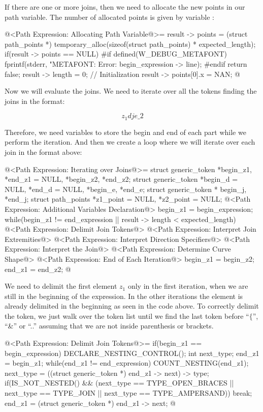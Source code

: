 If there are one or more joins, then we need to allocate the new
points in our path variable. The number of allocated points is given
by variable :

\iniciocodigo
@<Path Expression: Allocating Path Variable@>=
result -> points = (struct path_points *)
                     temporary_alloc(sizeof(struct path_points) *
                     expected_length);
if(result -> points == NULL){
#if defined(W_DEBUG_METAFONT)
  fprintf(stderr, "METAFONT: Error: %
          begin_expression -> line);
#endif
    return false;
}
result -> length = 0; // Initialization
result -> points[0].x = NAN;
@
\fimcodigo

Now we will evaluate the joins. We need to iterate over all the tokens
finding the joins in the format:

$$
z_1{d} j {e}\_2
$$

Therefore, we need variables to store the begin and end of each part
while we perform the iteration. And then we create a loop where we
will iterate over each join in the format above:

\iniciocodigo
@<Path Expression: Iterating over Joins@>=
{
  struct generic_token *begin_z1, *end_z1 = NULL, *begin_z2, *end_z2;
  struct generic_token *begin_d = NULL, *end_d = NULL, *begin_e, *end_e;
  struct generic_token * begin_j, *end_j;
  struct path_points *z1_point = NULL, *z2_point = NULL;
  @<Path Expression: Additional Variables Declaration@>
  begin_z1 = begin_expression;
  while(begin_z1 != end_expression || result -> length < expected_length){
    @<Path Expression: Delimit Join Tokens@>
    @<Path Expression: Interpret Join Extremities@>
    @<Path Expression: Interpret Direction Specifiers@>
    @<Path Expression: Interpret the Join@>
    @<Path Expression: Determine Curve Shape@>
    @<Path Expression: End of Each Iteration@>
    begin_z1 = begin_z2;
    end_z1 = end_z2;
  }
}
@
\fimcodigo

We need to delimit the first element $z_1$ only in the first
iteration, when we are still in the beginning of the expression. In
the other iterations the element is already delimited in the beginning
as seen in the code above. To correctly delimit the token, we just
walk over the token list until we find the last token before ``$\{$'',
``\&'' or ``..'' assuming that we are not inside parenthesis or
brackets.

\iniciocodigo
@<Path Expression: Delimit Join Tokens@>=
if(begin_z1 == begin_expression){
  DECLARE_NESTING_CONTROL();
  int next_type;
  end_z1 = begin_z1;
  while(end_z1 != end_expression){
    COUNT_NESTING(end_z1);
    next_type = ((struct generic_token *) end_z1 -> next) -> type;
    if(IS_NOT_NESTED() &&
       (next_type == TYPE_OPEN_BRACES || next_type == TYPE_JOIN ||
        next_type == TYPE_AMPERSAND))
      break;
    end_z1 = (struct generic_token *) end_z1 -> next;
  }
}
@
\fimcodigo

